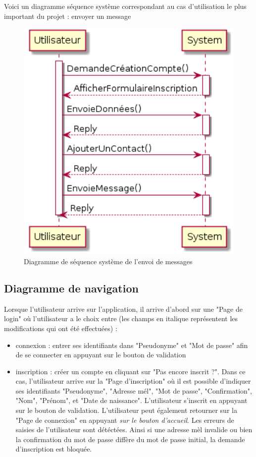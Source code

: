	Voici un diagramme séquence système correspondant au cas d'utilisation le plus important du projet : envoyer un message
	\begin{figure}[H]
		\centerline{\includegraphics[width=12.5cm]{img/sequenceSystemeEnvoiMessage.png}}
		\caption{Diagramme de séquence système de l'envoi de messages}
	\end{figure}

	\newpage

	\subsection{Diagramme de navigation}
	Lorsque l'utilisateur arrive sur l'application, il arrive d'abord sur une "Page de login" où l'utilisateur a le choix entre (les champs en italique représentent les modifications qui ont été effectuées) :
	\begin{itemize}
		\item connexion : entrer ses identifiants dans "Pseudonyme" et "Mot de passe" afin de se connecter en appuyant sur le bouton de validation
		\item inscription : créer un compte en cliquant sur "Pas encore inscrit ?".
		Dans ce cas, l'utilisateur arrive sur la "Page d'inscription" où il est possible d'indiquer ses identifiants "Pseudonyme", "Adresse mél", "Mot de passe", "Confirmation", "Nom", "Prénom", et "Date de naissance".
		L'utilisateur s'inscrit en appuyant sur le bouton de validation.
		L'utilisateur peut également retourner sur la "Page de connexion" en appuyant \textit{sur le bouton d'accueil}.
		Les erreurs de saisies de l'utilisateur sont détéctées. Ainsi si une adresse mèl invalide ou bien la confirmation du mot de passe diffère du mot de passe initial, la demande d'inscription est bloquée.\\
	\end{itemize}

